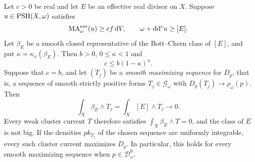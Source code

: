 \begin{proposition}\label{prop:threshold-divisorial-constraint}
Let $c>0$ be real and let $E$ be an effective real divisor on $X$. Suppose $u\in\mathrm{PSH}(X,\omega)$ satisfies
\[
 \mathrm{MA}^{\mathrm{ext}}_\omega(u)\geq c f\,\mathrm{d}V,
 \qquad \omega+\mathrm{dd}^{\mathrm{c}} u\geq[E].
\]
Let $\beta_E$ be a smooth closed representative of the Bott--Chern class of $[E]$, and put $\kappa=\kappa_\omega(\beta_E)$. Then $b>0$, $0\leq\kappa<1$ and
\begin{equation}\label{eq:divisorial-coefficient-loss}
 c\leq b(1-\kappa)^n.
\end{equation}
Suppose that $c=b$, and let $(T_j)$ be a \emph{smooth maximizing sequence} for $D_p$, that is, a sequence of smooth strictly positive forms $T_j\in\mathscr G_\omega$ with $D_p(T_j)\to\rho_\omega(p)$. Then
\[
 \int_X\beta_E\wedge T_j=\int_X[E]\wedge T_j\longrightarrow0.
\]
Every weak cluster current $T$ therefore satisfies $\int_X\beta_E\wedge T=0$, and the class of $E$ is not big. If the densities $p k_{T_j}$ of the chosen sequence are uniformly integrable, every such cluster current maximizes $D_p$. In particular, this holds for every smooth maximizing sequence when $p\in\mathcal D_\omega^0$.
\end{proposition}
